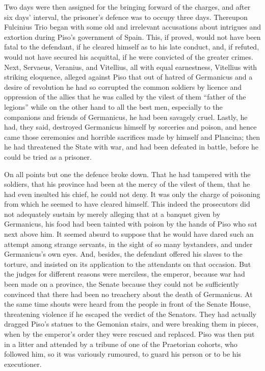 Two days were then assigned for the bringing forward of the charges, and after six days' interval, the prisoner's defence was to occupy three days. Thereupon Fulcinius Trio began with some old and irrelevant accusations about intrigues and extortion during Piso's government of Spain. This, if proved, would not have been fatal to the defendant, if he cleared himself as to his late conduct, and, if refuted, would not have secured his acquittal, if he were convicted of the greater crimes. Next, Servaeus, Veranius, and Vitellius, all with equal earnestness, Vitellius with striking eloquence, alleged against Piso that out of hatred of Germanicus and a desire of revolution he had so corrupted the common soldiers by licence and oppression of the allies that he was called by the vilest of them ``father of the legions'' while on the other hand to all the best men, especially to the companions and friends of Germanicus, he had been savagely cruel. Lastly, he had, they said, destroyed Germanicus himself by sorceries and poison, and hence came those ceremonies and horrible sacrifices made by himself and Plancina; then he had threatened the State with war, and had been defeated in battle, before he could be tried as a prisoner.


On all points but one the defence broke down. That he had tampered with the soldiers, that his province had been at the mercy of the vilest of them, that he had even insulted his chief, he could not deny. It was only the charge of poisoning from which he seemed to have cleared himself. This indeed the prosecutors did not adequately sustain by merely alleging that at a banquet given by Germanicus, his food had been tainted with poison by the hands of Piso who sat next above him. It seemed absurd to suppose that he would have dared such an attempt among strange servants, in the sight of so many bystanders, and under Germanicus's own eyes. And, besides, the defendant offered his slaves to the torture, and insisted on its application to the attendants on that occasion. But the judges for different reasons were merciless, the emperor, because war had been made on a province, the Senate because they could not be sufficiently convinced that there had been no treachery about the death of Germanicus. At the same time shouts were heard from the people in front of the Senate House, threatening violence if he escaped the verdict of the Senators. They had actually dragged Piso's statues to the Gemonian stairs, and were breaking them in pieces, when by the emperor's order they were rescued and replaced. Piso was then put in a litter and attended by a tribune of one of the Praetorian cohorts, who followed him, so it was variously rumoured, to guard his person or to be his executioner.

